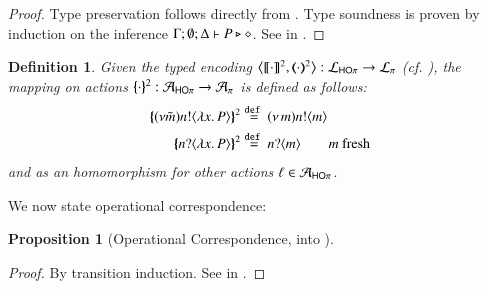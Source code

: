 \documentclass[preprint,11pt]{elsarticle}
\newtheorem{definition}{Definition}[section]
\newtheorem{proposition}{Proposition}[section]
\begin{document}
{\begin{proof}
Type preservation follows directly from .
Type soundness is proven	by induction on the inference $\Gamma; \emptyset; \Delta \vdash P \triangleright \diamond$.
	See  in 
	.
\end{proof}

\begin{definition}%
\label{d:actmap2}
Given the typed encoding 
$\enco{\map{\cdot}^{2}, \mapt{\cdot}^{2} %
}: \tyl{L}_{\HOp} \to \tyl{L}_{\sessp}$  (cf. ), 
the mapping on actions $\{\!\!\{\cdot\}\!\!\}^{2}: \mathcal{A}_{\mathsf{HO}\pi} \to \mathcal{A}_{\pi}$ is defined as follows:
	\begin{align*}
		\mapa{(\nu \tilde{m})\bactout{n}{\abs{ x}{P}} }^{2} & \defeq \news{m} \bactout{n}{m}
		\\
		\mapa{\bactinp{n}{\abs{ x}{P}} }^{2} & \defeq \bactinp{n}{m} \quad \quad m \text{ fresh}
	\end{align*}
	and as an homomorphism for other actions $\ell \in \mathcal{A}_{\mathsf{HO}\pi}$.
\end{definition}

We now state operational correspondence: %

\begin{proposition}[Operational Correspondence, \HOp into \sessp]\myrm
	\label{prop:op_corr_HOp_to_p}
	
	\end{proposition}

\begin{proof}
	\noi By transition induction.
	See  in 
	.
\end{proof}

}
\end{document}

